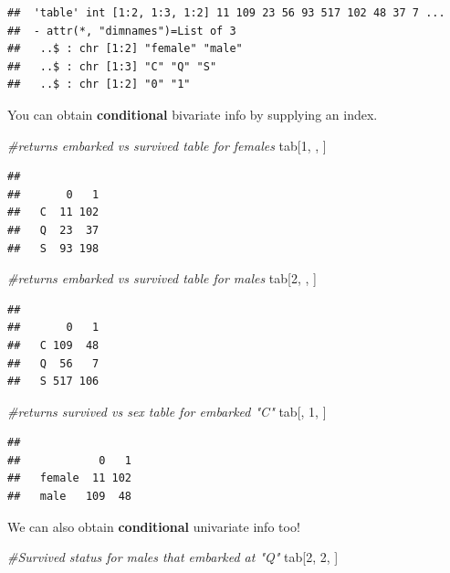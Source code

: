 \documentclass[
]{book}
\newenvironment{Shaded}{\begin{snugshade}}{\end{snugshade}}
\newcommand{\CommentTok}[1]{\textcolor[rgb]{0.56,0.35,0.01}{\textit{#1}}}
\newcommand{\DecValTok}[1]{\textcolor[rgb]{0.00,0.00,0.81}{#1}}
\newcommand{\NormalTok}[1]{#1}
\theoremstyle{definition}
\theoremstyle{definition}
\theoremstyle{definition}
\theoremstyle{remark}
\begin{document}
\begin{verbatim}
##  'table' int [1:2, 1:3, 1:2] 11 109 23 56 93 517 102 48 37 7 ...
##  - attr(*, "dimnames")=List of 3
##   ..$ : chr [1:2] "female" "male"
##   ..$ : chr [1:3] "C" "Q" "S"
##   ..$ : chr [1:2] "0" "1"
\end{verbatim}

You can obtain \textbf{conditional} bivariate info by supplying an index.

\begin{Shaded}
\begin{Highlighting}[]
\CommentTok{#returns embarked vs survived table for females}
\NormalTok{tab[}\DecValTok{1}\NormalTok{, , ]}
\end{Highlighting}
\end{Shaded}

\begin{verbatim}
##    
##       0   1
##   C  11 102
##   Q  23  37
##   S  93 198
\end{verbatim}

\begin{Shaded}
\begin{Highlighting}[]
\CommentTok{#returns embarked vs survived table for males}
\NormalTok{tab[}\DecValTok{2}\NormalTok{, , ]}
\end{Highlighting}
\end{Shaded}

\begin{verbatim}
##    
##       0   1
##   C 109  48
##   Q  56   7
##   S 517 106
\end{verbatim}

\begin{Shaded}
\begin{Highlighting}[]
\CommentTok{#returns survived vs sex table for embarked "C"}
\NormalTok{tab[, }\DecValTok{1}\NormalTok{, ]}
\end{Highlighting}
\end{Shaded}

\begin{verbatim}
##         
##            0   1
##   female  11 102
##   male   109  48
\end{verbatim}

We can also obtain \textbf{conditional} univariate info too!

\begin{Shaded}
\begin{Highlighting}[]
\CommentTok{#Survived status for males that embarked at "Q"}
\NormalTok{tab[}\DecValTok{2}\NormalTok{, }\DecValTok{2}\NormalTok{, ]}
\end{Highlighting}
\end{Shaded}
\end{document}
